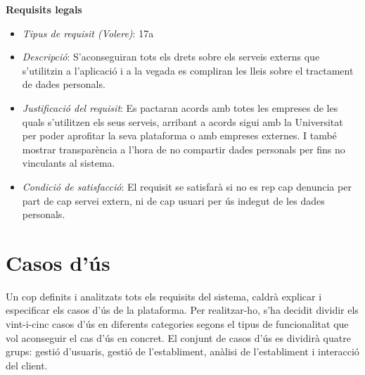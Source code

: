 \noindent\textbf{Requisits legals}
\begin{itemize}
\item \textit{Tipus de requisit (Volere)}: 17a
\item \textit{Descripció}: S'aconseguiran tots els drets sobre els serveis externs que s'utilitzin a l'aplicació i a la vegada es compliran les lleis sobre el tractament de dades personals.
\item \textit{Justificació del requisit}: Es pactaran acords amb totes les empreses de les quals s'utilitzen els seus serveis, arribant a acords sigui amb la Universitat per poder aprofitar la seva plataforma o amb empreses externes. I també mostrar transparència a l'hora de no compartir dades personals per fins no vinculants al sistema.
\item \textit{Condició de satisfacció}: El requisit se satisfarà si no es rep cap denuncia per part de cap servei extern, ni de cap usuari per ús indegut de les dades personals.
\end{itemize}



\newpage
\section{Casos d'ús}

Un cop definits i analitzats tots els requisits del sistema, caldrà explicar i especificar els casos d'ús de la plataforma. Per realitzar-ho, s'ha decidit dividir els vint-i-cinc casos d'ús en diferents categories segons el tipus de funcionalitat que vol aconseguir el cas d'ús en concret. El conjunt de casos d'ús es dividirà quatre grups: gestió d'usuaris, gestió de l'establiment, anàlisi de l'establiment i interacció del client.

